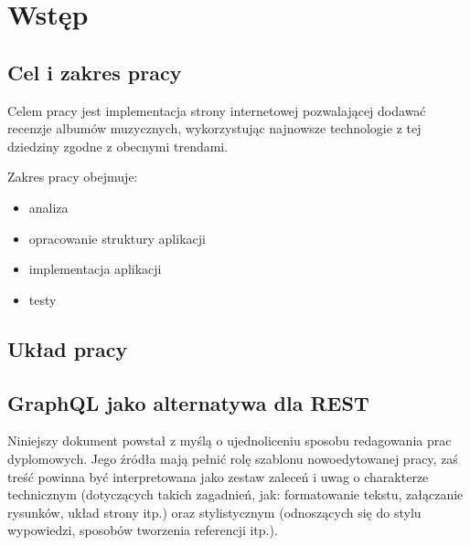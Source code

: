\chapter{Wstęp}
\section{Cel i zakres pracy}
	Celem pracy jest implementacja strony internetowej pozwalającej dodawać recenzje albumów muzycznych,
	wykorzystując najnowsze technologie z tej dziedziny zgodne z obecnymi trendami.


	Zakres pracy obejmuje:
	\begin{itemize}
		\item analiza 
		\item opracowanie struktury aplikacji
		\item implementacja aplikacji
		\item testy 
	\end{itemize}
	
\section{Układ pracy}

\section{GraphQL jako alternatywa dla REST}

Niniejszy dokument powstał z myślą o ujednoliceniu sposobu redagowania prac dyplomowych. Jego źródła mają pełnić rolę szablonu nowoedytowanej pracy, zaś treść powinna być interpretowana jako zestaw zaleceń i uwag o charakterze technicznym (dotyczących takich zagadnień, jak: formatowanie tekstu, załączanie rysunków, układ strony itp.) oraz stylistycznym (odnoszących się do stylu wypowiedzi, sposobów tworzenia referencji itp.).



